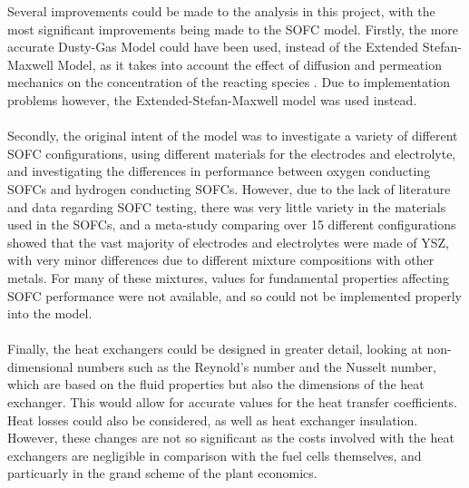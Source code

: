 Several improvements could be made to the analysis in this project, with the most significant improvements being made to the SOFC model. Firstly, the more accurate Dusty-Gas Model could have been used, instead of the Extended Stefan-Maxwell Model, as it takes into account the effect of diffusion and permeation mechanics on the concentration of the reacting species \cite{LM3}. Due to implementation problems however, the Extended-Stefan-Maxwell model was used instead.\\
\hspace{1cm}\\
Secondly, the original intent of the model was to investigate a variety of different SOFC configurations, using different materials for the electrodes and electrolyte, and investigating the differences in performance between oxygen conducting SOFCs and hydrogen conducting SOFCs. However, due to the lack of literature and data regarding SOFC testing, there was very little variety in the materials used in the SOFCs, and a meta-study \cite{MD} comparing over 15 different configurations showed that the vast majority of electrodes and electrolytes were made of YSZ, with very minor differences due to different mixture compositions with other metals. For many of these mixtures, values for fundamental properties affecting SOFC performance were not available, and so could not be implemented properly into the model.\\
\hspace{1cm}\\
Finally, the heat exchangers could be designed in greater detail, looking at non-dimensional numbers such as the Reynold's number and the Nusselt number, which are based on the fluid properties but also the dimensions of the heat exchanger. This would allow for accurate values for the heat transfer coefficients. Heat losses could also be considered, as well as heat exchanger insulation. However, these changes are not so significant as the costs involved with the heat exchangers are negligible in comparison with the fuel cells themselves, and particuarly in the grand scheme of the plant economics.



